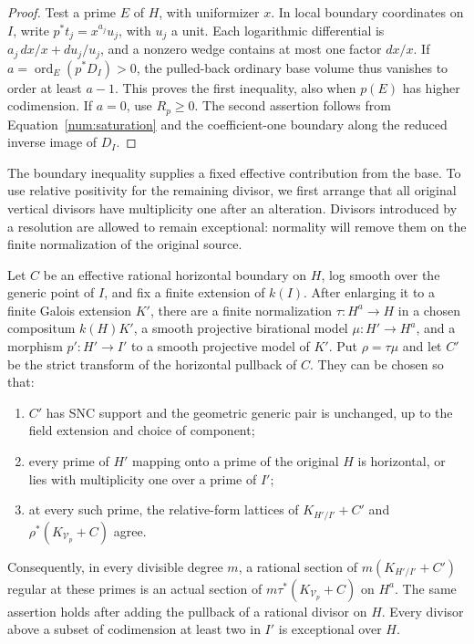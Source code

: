\begin{proof}
Test a prime $E$ of $H$, with uniformizer $x$. In local boundary
coordinates on $I$, write $p^*t_j=x^{a_j}u_j$, with $u_j$ a unit.
Each logarithmic differential is $a_j\,dx/x+du_j/u_j$, and a
nonzero wedge contains at most one factor $dx/x$. If
$a=\operatorname{ord}_E(p^*D_I)>0$, the pulled-back ordinary base
volume thus vanishes to order at least $a-1$. This proves the first
inequality, also when $p(E)$ has higher codimension. If $a=0$, use
$R_p\geq0$. The second assertion follows from
Equation~\eqref{num:saturation} and the coefficient-one boundary
along the reduced inverse image of $D_I$.
\end{proof}

The boundary inequality supplies a fixed effective contribution from
the base. To use relative positivity for the remaining divisor, we
first arrange that all original vertical divisors have multiplicity
one after an alteration. Divisors introduced by a resolution are
allowed to remain exceptional: normality will remove them on the
finite normalization of the original source.

\begin{lemma}\label{num:alteration}
Let $C$ be an effective rational horizontal boundary on $H$, log smooth
over the generic point of $I$, and fix a finite extension of $k(I)$.
After enlarging it to a finite Galois extension $K'$, there are a finite
normalization $\tau:H^a\to H$ in a chosen compositum $k(H)K'$, a
smooth projective birational model $\mu:H'\to H^a$, and a morphism
$p':H'\to I'$ to a smooth projective model of $K'$. Put $\rho=\tau\mu$
and let $C'$ be the strict transform of the horizontal pullback of $C$.
They can be chosen so that:
\begin{enumerate}[label=\textup{(\roman*)}]
\item $C'$ has SNC support and the geometric generic pair is unchanged,
up to the field extension and choice of component;
\item every prime of $H'$ mapping onto a prime of the original $H$
is horizontal, or lies with multiplicity one over a prime of $I'$;
\item at every such prime, the relative-form lattices of
$K_{H'/I'}+C'$ and $\rho^*(K_{\mathcal V_p}+C)$ agree.
\end{enumerate}
Consequently, in every divisible degree $m$, a rational section of
$m(K_{H'/I'}+C')$ regular at these primes is an actual section of
$m\tau^*(K_{\mathcal V_p}+C)$ on $H^a$. The same assertion holds after adding
the pullback of a rational divisor on $H$. Every divisor above a
subset of codimension at least two in $I'$ is exceptional over $H$.
\end{lemma}

